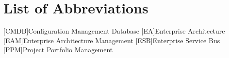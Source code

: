 
\chapter*{List of Abbreviations}

\begin{acronym}[ewuifbwejkbfjksbjkcbsdjcjkn3j]%
[CMDB]{Configuration Management Database}
[EA]{Enterprise Architecture}
[EAM]{Enterprise Architecture Management}
[ESB]{Enterprise Service Bus}
[PPM]{Project Portfolio Management}

%


\end{acronym}